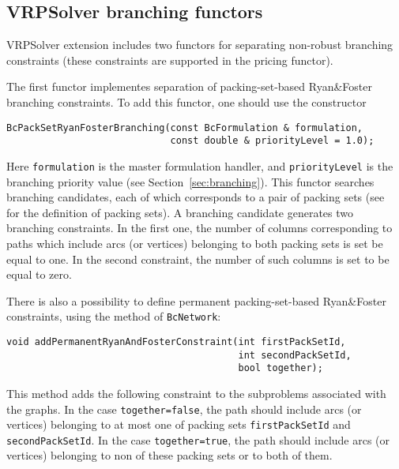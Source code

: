 \documentclass[10pt,a4paper]{article}
\begin{document}
\subsection{VRPSolver branching functors}
\label{sec:vrpsolverbranching}

VRPSolver extension includes two functors for separating non-robust branching constraints (these constraints are
supported in the pricing functor).

The first functor implementes separation of packing-set-based Ryan\&Foster branching constraints. To add this functor,
one should use the constructor
\begin{lstlisting}
BcPackSetRyanFosterBranching(const BcFormulation & formulation,
                             const double & priorityLevel = 1.0);
\end{lstlisting}
Here \verb+formulation+ is the master formulation handler, and \verb+priorityLevel+ is the branching priority value 
(see Section~\ref{sec:branching}). This functor searches branching candidates, each of which corresponds to a pair of
packing sets (see~\cite{PessoaSadykovUchoa:20a} for the definition of packing sets). A branching candidate generates two
branching constraints. In the first one, the number of columns corresponding to paths which include arcs (or vertices)
belonging to both packing sets is set be equal to one. In the second constraint, the number of such columns is set to be
equal to zero.

There is also a possibility to define permanent packing-set-based Ryan\&Foster constraints, using the method
of \verb+BcNetwork+:
\begin{lstlisting}
void addPermanentRyanAndFosterConstraint(int firstPackSetId, 
                                         int secondPackSetId, 
                                         bool together);
\end{lstlisting}
This method adds the following constraint to the subproblems associated with the graphs. In the case
\verb+together=false+, the path should include arcs (or vertices) belonging to at most one of packing sets
\verb+firstPackSetId+ and \verb+secondPackSetId+. In the case \verb+together=true+, the path should include arcs (or
vertices) belonging to non of these packing sets or to both of them.

\bigskip
\end{document}

